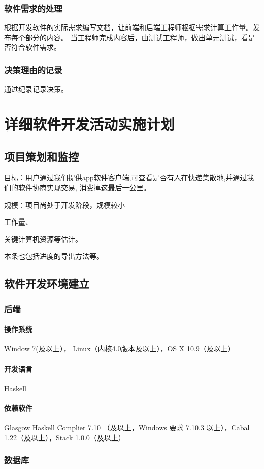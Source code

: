 \documentclass[UTF8]{dingo}
\begin{document}
      \subsubsection{软件需求的处理}
        根据开发软件的实际需求编写文档，让前端和后端工程师根据需求计算工作量。发布每个部分的内容。
        当工程师完成内容后，由测试工程师，做出单元测试，看是否符合软件需求。
      \subsubsection{决策理由的记录}
        通过纪录记录决策。
  \section{详细软件开发活动实施计划}
    \subsection{项目策划和监控}
      目标：用户通过我们提供app软件客户端,可查看是否有人在快递集散地,并通过我们的软件协商实现交易, 消费掉这最后一公里。

      规模：项目尚处于开发阶段，规模较小

      工作量、

      关键计算机资源等估计。

      本条也包括进度的导出方法等。
    \subsection{软件开发环境建立}
      \subsubsection{后端}
        \paragraph{操作系统} Window 7(及以上）， Linux（内核4.0版本及以上），OS X 10.9（及以上）
        \paragraph{开发语言} Haskell
        \paragraph{依赖软件} Glasgow Haskell Complier 7.10 （及以上，Windows 要求 7.10.3 以上），Cabal 1.22（及以上），Stack 1.0.0（及以上）
      \subsubsection{数据库}
\end{document}
